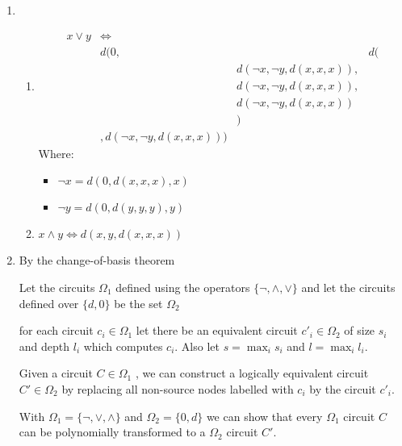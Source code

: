 \documentclass{article}
\begin{document}
\begin{enumerate}
\begin{enumerate}
          \item
                \begin{enumerate}

                  \item
                        \begin{align*}
                          x \vee y &\Longleftrightarrow \\
                          & d(0, && d(\\
                                && d(\neg x,\neg y,d(x,x,x)),\\
                                && d(\neg x,\neg y,d(x,x,x)),\\
                                && d(\neg x,\neg y,d(x,x,x)) \\
                          &&) \\
                         &,d(\neg x,\neg y,d(x,x,x)))
                        \end{align*}
                        Where:
                        \begin{itemize}
                          \item $\neg x = d(0,d(x,x,x),x)$
                          \item $\neg y = d(0,d(y,y,y),y)$
                        \end{itemize}

           \item $x \wedge y \Longleftrightarrow d(x,y,d(x,x,x))$
         \end{enumerate}

  \item By the change-of-basis theorem

        Let the circuits $\Omega_{1}$ defined using the operators $\{ \neg , \wedge , \vee \} $ and let the circuits defined over $\{ d, 0 \} $ be the set $\Omega_{2}$

        for each circuit $c_{i} \in \Omega_{1}$ let there be an equivalent circuit $c'_{i} \in \Omega_{2}$ of size $s_{i}$ and depth $l_{i}$ which computes $c_{i}$. Also let $s = \max_{i} s_{i}$ and $l = \max_{i} l_{i}$.

        Given a circuit $C \in \Omega_{1}$ , we can construct a logically equivalent circuit $C' \in \Omega_{2}$ by replacing all non-source nodes labelled with $c_{i}$ by the circuit $c'_{i}$.

        With $\Omega_{1} = \{ \neg , \vee , \wedge\} $ and $\Omega_{2} = \{ 0, d \} $ we can show that every $\Omega_{1}$ circuit $C $ can be polynomially transformed to a $\Omega_{2}$ circuit $C'$.


\end{enumerate}
\end{enumerate}
\end{document}
